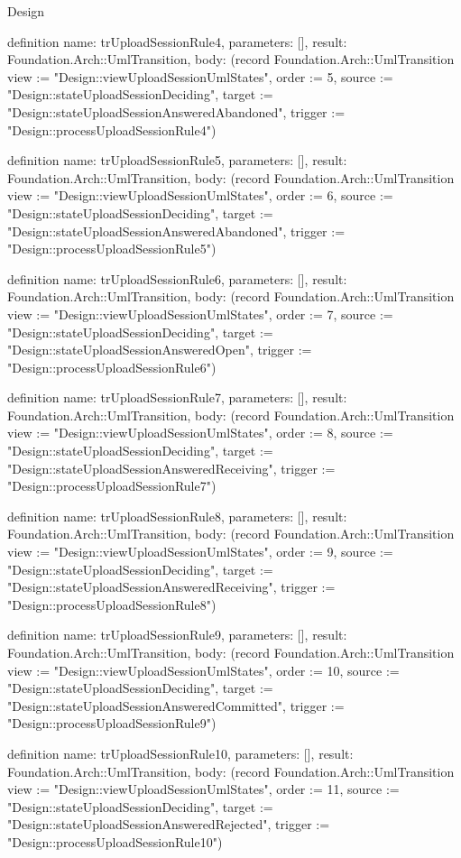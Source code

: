 \begin{lexlean}{Design}
\begin{semanticmodule}
definition{
  name: trUploadSessionRule4,
  parameters: [],
  result: Foundation.Arch::UmlTransition,
  body: (record Foundation.Arch::UmlTransition {view := "Design::viewUploadSessionUmlStates", order := 5, source := "Design::stateUploadSessionDeciding", target := "Design::stateUploadSessionAnsweredAbandoned", trigger := "Design::processUploadSessionRule4"})
}

definition{
  name: trUploadSessionRule5,
  parameters: [],
  result: Foundation.Arch::UmlTransition,
  body: (record Foundation.Arch::UmlTransition {view := "Design::viewUploadSessionUmlStates", order := 6, source := "Design::stateUploadSessionDeciding", target := "Design::stateUploadSessionAnsweredAbandoned", trigger := "Design::processUploadSessionRule5"})
}

definition{
  name: trUploadSessionRule6,
  parameters: [],
  result: Foundation.Arch::UmlTransition,
  body: (record Foundation.Arch::UmlTransition {view := "Design::viewUploadSessionUmlStates", order := 7, source := "Design::stateUploadSessionDeciding", target := "Design::stateUploadSessionAnsweredOpen", trigger := "Design::processUploadSessionRule6"})
}

definition{
  name: trUploadSessionRule7,
  parameters: [],
  result: Foundation.Arch::UmlTransition,
  body: (record Foundation.Arch::UmlTransition {view := "Design::viewUploadSessionUmlStates", order := 8, source := "Design::stateUploadSessionDeciding", target := "Design::stateUploadSessionAnsweredReceiving", trigger := "Design::processUploadSessionRule7"})
}

definition{
  name: trUploadSessionRule8,
  parameters: [],
  result: Foundation.Arch::UmlTransition,
  body: (record Foundation.Arch::UmlTransition {view := "Design::viewUploadSessionUmlStates", order := 9, source := "Design::stateUploadSessionDeciding", target := "Design::stateUploadSessionAnsweredReceiving", trigger := "Design::processUploadSessionRule8"})
}

definition{
  name: trUploadSessionRule9,
  parameters: [],
  result: Foundation.Arch::UmlTransition,
  body: (record Foundation.Arch::UmlTransition {view := "Design::viewUploadSessionUmlStates", order := 10, source := "Design::stateUploadSessionDeciding", target := "Design::stateUploadSessionAnsweredCommitted", trigger := "Design::processUploadSessionRule9"})
}

definition{
  name: trUploadSessionRule10,
  parameters: [],
  result: Foundation.Arch::UmlTransition,
  body: (record Foundation.Arch::UmlTransition {view := "Design::viewUploadSessionUmlStates", order := 11, source := "Design::stateUploadSessionDeciding", target := "Design::stateUploadSessionAnsweredRejected", trigger := "Design::processUploadSessionRule10"})
}


\end{semanticmodule}
\end{lexlean}
